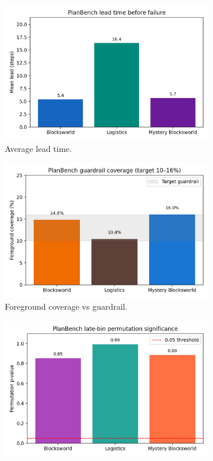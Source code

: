 \documentclass[11pt]{article}
\begin{document}
\begin{figure}[h]
  \centering
  \begin{subfigure}[t]{0.32\textwidth}
    \includegraphics[width=\textwidth]{figures/planbench_lead.png}
    \caption{Average lead time.}
  \end{subfigure}\hfill
  \begin{subfigure}[t]{0.32\textwidth}
    \includegraphics[width=\textwidth]{figures/planbench_guardrail.png}
    \caption{Foreground coverage vs guardrail.}
  \end{subfigure}\hfill
  \begin{subfigure}[t]{0.32\textwidth}
    \includegraphics[width=\textwidth]{figures/planbench_permutation.png}

\end{subfigure}
\end{figure}
\end{document}

